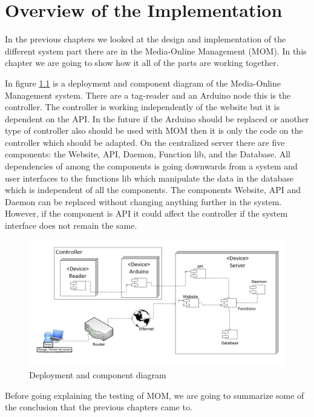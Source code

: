 \chapter{Overview of the Implementation}

In the previous chapters we looked at the design and implementation of the different system part there are in the Media-Online Management (MOM).
In this chapter we are going to show how it all of the parts are working together.

In figure \ref{fig:deployment} is a deployment and component diagram of the Media-Online Management system. There are a tag-reader and an Arduino node this is the controller. The controller is working independently of the website but it is dependent on the API. In the future if the Arduino should be replaced or another type of controller also should be used with MOM then it is only the code on the controller which should be adapted. 
On the centralized server there are five components: the Website, API, Daemon, Function lib, and the Database. All dependencies of among the components is going downwards from a system and user interfaces to the functions lib which manipulate the data in the database which is independent of all the components.
 The components Website, API and Daemon can be replaced without changing anything further in the system. However, if the component is API it could affect the controller if the system interface does not remain the same.
    
\begin{figure}
	\centering
		\includegraphics[width=1.50\textwidth, angle=90 ]{images/deployment.jpg}
	\caption{Deployment and component diagram}
	\label{fig:deployment}
\end{figure}



Before going explaining the testing of MOM, we are going to summarize some of the conclusion that the previous chapters came to.

